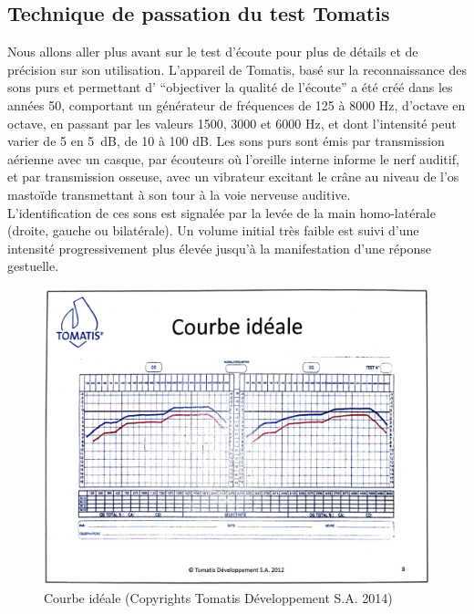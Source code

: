 \subsection{Technique de passation du test Tomatis\textsuperscript \textregistered }
Nous allons aller plus avant sur le test d'écoute pour plus de détails et de précision sur son utilisation.
L'appareil de Tomatis, basé sur la reconnaissance des sons purs 
et permettant d'
\enquote{objectiver la qualité de l'écoute} \autocite [34--35]{Tomatislangage}
 a été créé dans les années 50, comportant un générateur de fréquences
  de 125 à 8000 Hz, d'octave en octave, en passant par les valeurs
1500, 3000 et 6000 Hz, et dont l'intensité peut varier de 5 en \SI{5}{\dB}, de 10 à 100 dB.
Les sons purs sont émis par 
  transmission aérienne avec un casque, par écouteurs où l'oreille interne
  informe le nerf auditif,  et par transmission osseuse,
  avec un vibrateur  excitant le crâne au
  niveau de l'os mastoïde transmettant à son tour à  la voie nerveuse
  auditive.
  \\
L'identification de ces sons est
  signalée par la levée de la main homo-latérale (droite, gauche ou
  bilatérale).
Un volume initial très faible est suivi d'une intensité
progressivement plus élevée jusqu'à la manifestation d'une réponse gestuelle.
\begin{figure}
	\centering
	\includegraphics[width=0.7
	\linewidth]{images/graphiques/courbeideale.png}
	\caption[Courbe idéale]{Courbe idéale (Copyrights Tomatis Développement S.A.  2014) }
	\label{Courbe idéale}
\end{figure}
